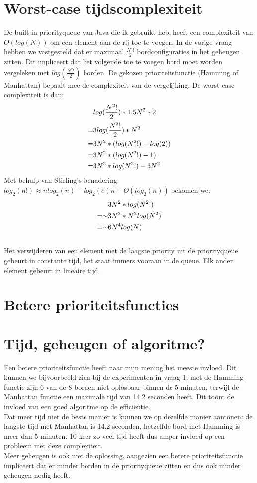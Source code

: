 \documentclass[11pt, a4paper]{article}
\begin{document}
\section*{Worst-case tijdscomplexiteit}
De built-in priorityqueue van Java die ik gebruikt heb, heeft een complexiteit van $O(log(N))$ om een element aan de rij toe te voegen. In de vorige vraag hebben we vastgesteld dat er maximaal $\frac{N^2!}{2}$ bordconfiguraties in het geheugen zitten. Dit impliceert dat het volgende toe te voegen bord moet worden vergeleken met $log(\frac{N^2!}{2})$ borden. De gekozen prioriteitsfunctie (Hamming of Manhattan) bepaalt mee de complexiteit van de vergelijking. De worst-case complexiteit is dan:
\\
	\begin{align}
	\centering
		&log(\frac{N^2!}{2}) * 1.5N^2 * 2 \\
	=   & 3log(\frac{N^2!}{2})*N^{2} \\
	=	& 3N^2*(log(N^2!)-log(2)) \\
	=   & 3N^2*(log(N^2!)-1) \\
	=   & 3N^2*log(N^2!) - 3N^2
	\end{align}
	Met behulp van Stirling's benadering $log_2(n!) \approx nlog_2(n) - log_2(e)n + O(log_2(n))$ bekomen we:
	\begin{align}
	\centering
		& 3N^2*log(N^2!) \\
	=\sim	& 3N^2*N^2log(N^2)\\
	=\sim	& 6N^4log(N)
	\end{align}
	\\
Het verwijderen van een element met de laagste priority uit de priorityqueue gebeurt in constante tijd, het staat immers vooraan in de queue. Elk ander element gebeurt in lineaire tijd. 
\newpage
\section*{Betere prioriteitsfuncties}
	

\section*{Tijd, geheugen of algoritme?}
Een betere prioriteitsfunctie heeft naar mijn mening het meeste invloed. Dit kunnen we bijvoorbeeld zien bij de experimenten in vraag 1: met de Hamming functie zijn 6 van de 8 borden niet oplosbaar binnen de 5 minuten, terwijl de Manhattan functie een maximale tijd van 14.2 seconden heeft. Dit toont de invloed van een goed algoritme op de effici\"entie.\\
Dat meer tijd niet de beste manier is kunnen we op dezelfde manier aantonen: de langste tijd met Manhattan is 14.2 seconden, hetzelfde bord met Hamming is meer dan 5 minuten. 10 keer zo veel tijd heeft dus amper invloed op een probleem met deze complexiteit.\\
Meer geheugen is ook niet de oplossing, aangezien een betere prioriteitsfunctie impliceert dat er minder borden in de priorityqueue zitten en dus ook minder geheugen nodig heeft.
	
\end{document}
